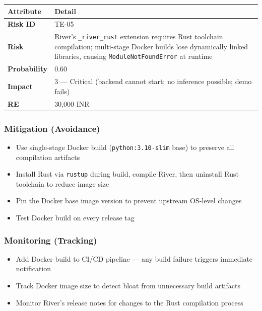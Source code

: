 \documentclass[11pt, a4paper]{article}
\newcommand{\col}[1]{\texttt{\small #1}}
\begin{document}
\begin{center}
\small
\begin{tabular}{|l|p{10cm}|}
\hline
\rowcolor{orange!10}
\textbf{Attribute} & \textbf{Detail} \\
\hline
\textbf{Risk ID} & TE-05 \\
\hline
\textbf{Risk} & River's \col{\_river\_rust} extension requires Rust toolchain compilation; multi-stage Docker builds lose dynamically linked libraries, causing \col{ModuleNotFoundError} at runtime \\
\hline
\textbf{Probability} & 0.60 \\
\hline
\textbf{Impact} & 3 --- Critical (backend cannot start; no inference possible; demo fails) \\
\hline
\textbf{RE} & 30,000 INR \\
\hline
\end{tabular}
\normalsize
\end{center}

\subsubsection*{Mitigation (Avoidance)}
\begin{itemize}[leftmargin=*]
    \item Use single-stage Docker build (\col{python:3.10-slim} base) to preserve all compilation artifacts
    \item Install Rust via \col{rustup} during build, compile River, then uninstall Rust toolchain to reduce image size
    \item Pin the Docker base image version to prevent upstream OS-level changes
    \item Test Docker build on every release tag
\end{itemize}

\subsubsection*{Monitoring (Tracking)}
\begin{itemize}[leftmargin=*]
    \item Add Docker build to CI/CD pipeline --- any build failure triggers immediate notification
    \item Track Docker image size to detect bloat from unnecessary build artifacts
    \item Monitor River's release notes for changes to the Rust compilation process
\end{itemize}
\end{document}
